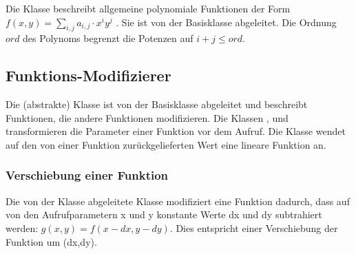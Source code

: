 Die Klasse  beschreibt allgemeine polynomiale 
Funktionen der Form
$ f(x,y) = \sum_{i,j} a_{i,j} \cdot x^i y^j$ . 
Sie ist von der Basisklasse  abgeleitet. 
Die Ordnung $ord$ des Polynoms begrenzt die Potenzen auf
$i+j \le ord$.



\subsection{Funktions-Modifizierer}
\label{Function2dModifier}
\hypertarget{Function2dModifier}{}

Die (abstrakte) Klasse  ist von der Basisklasse
 abgeleitet und beschreibt Funktionen, die andere 
Funktionen modifizieren. Die Klassen ,
 und 
transformieren die Parameter einer Funktion vor dem Aufruf.
Die Klasse  wendet auf den von einer
Funktion zurückgelieferten Wert eine lineare Funktion an.



\subsubsection{Verschiebung einer Funktion}
\label{Function2dParameterShift}
\hypertarget{Function2dParameterShift}{}
Die von der Klasse  abgeleitete 
Klasse  modifiziert eine
Funktion dadurch, dass auf von den Aufrufparametern x und y konstante
Werte dx und dy subtrahiert werden: $ g(x,y) = f ( x - dx, y - dy ) $.
Dies entspricht einer Verschiebung der Funktion um (dx,dy).

